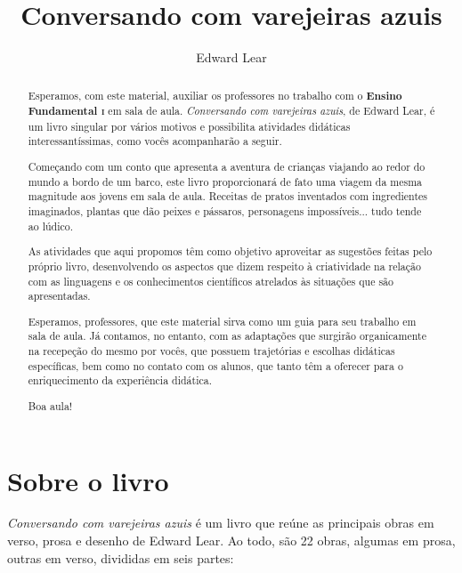\documentclass[11pt]{extarticle}
\newcommand{\AutorLivro}{Edward Lear}
\newcommand{\TituloLivro}{Conversando com varejeiras azuis}
\newcommand{\colaborador}{Renier Silva}
\begin{document}
\title{\TituloLivro}
\author{\AutorLivro}
\def\authornotes{\colaborador}

\date{}
\maketitle

\tableofcontents


\begin{abstract}

Esperamos, com este material,
auxiliar os professores no trabalho com o \textbf{Ensino Fundamental \textsc{i}} em 
sala de aula. \textit{Conversando com varejeiras azuis}, de Edward Lear, é um livro singular
por vários motivos e possibilita atividades didáticas interessantíssimas,
como vocês acompanharão a seguir.

Começando com um conto que apresenta a aventura de crianças viajando 
ao redor do mundo a bordo de um barco, este livro proporcionará de fato
uma viagem da mesma magnitude aos jovens em sala de aula. 
Receitas de pratos inventados com ingredientes imaginados, 
plantas que dão peixes e pássaros, personagens impossíveis...
tudo tende ao lúdico. 

As atividades que aqui propomos têm como objetivo aproveitar
as sugestões feitas pelo próprio livro, desenvolvendo 
os aspectos que dizem respeito à criatividade na relação
com as linguagens e os conhecimentos científicos atrelados 
às situações que são apresentadas. 

Esperamos, professores, que este material sirva como um guia 
para seu trabalho em sala de aula. Já contamos, no entanto, com as adaptações
que surgirão organicamente na recepeção do mesmo por vocês, que possuem 
trajetórias e escolhas didáticas específicas, bem como no contato com os 
alunos, que tanto têm a oferecer para o enriquecimento da experiência didática.

Boa aula!

\end{abstract}

\section{Sobre o livro}

\textit{Conversando com varejeiras azuis} é um livro que reúne as principais
obras em verso, prosa e desenho de Edward Lear.
Ao todo, são 22 obras, algumas em prosa, outras em verso, divididas
em seis partes: 
\end{document}
